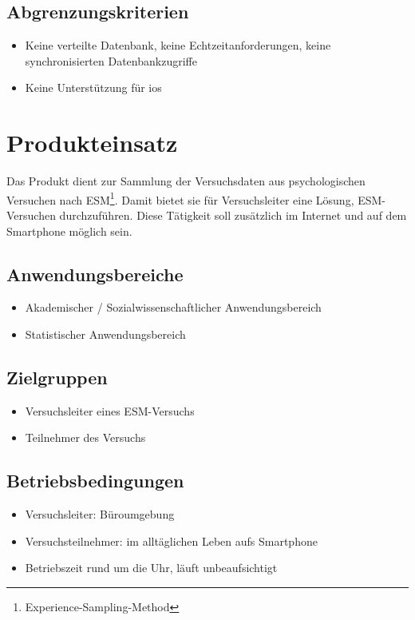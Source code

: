 \documentclass[a4paper]{scrreprt}
\begin{document}
        \section{Abgrenzungskriterien}
            \begin{itemize}
                \item Keine verteilte Datenbank, keine Echtzeitanforderungen, keine synchronisierten Datenbankzugriffe
                \item Keine Unterst\"utzung f\"ur ios
            \end{itemize}
 
    \chapter{Produkteinsatz}
        Das Produkt dient zur Sammlung der Versuchsdaten aus psychologischen Versuchen nach ESM\footnote{Experience-Sampling-Method}. Damit bietet sie für Versuchsleiter eine Lösung, ESM-Versuchen durchzuführen. Diese Tätigkeit soll zusätzlich im Internet und auf dem Smartphone möglich sein.
 
        \section{Anwendungsbereiche}
            \begin{itemize}
                \item Akademischer / Sozialwissenschaftlicher Anwendungsbereich
                \item Statistischer Anwendungsbereich
            \end{itemize}
 
        \section{Zielgruppen}
            \begin{itemize}
                \item Versuchsleiter eines ESM-Versuchs
                \item Teilnehmer des Versuchs
            \end{itemize}
 
        \section{Betriebsbedingungen}
            \begin{itemize}
                \item Versuchsleiter: Büroumgebung
                \item Versuchsteilnehmer: im alltäglichen Leben aufs Smartphone
                \item Betriebszeit rund um die Uhr, läuft unbeaufsichtigt
            \end{itemize}
 
\end{document}
